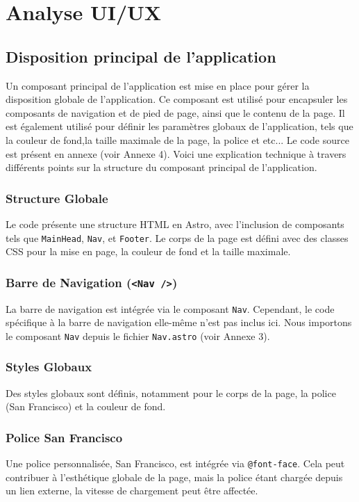 \documentclass[12pt, a4paper, oneside]{article}
\begin{document}
\newpage
\section{Analyse UI/UX}

\subsection{Disposition principal de l'application}

Un composant principal de l'application est mise en place pour gérer la disposition globale de l'application. Ce composant est utilisé pour encapsuler les composants de navigation et de pied de page, ainsi que le contenu de la page. Il est également utilisé pour définir les paramètres globaux de l'application, tels que la couleur de fond,la taille maximale de la page, la police et etc... \newline
Le code source est présent en annexe (voir Annexe 4). Voici une explication technique à travers différents points sur la structure du composant principal de l'application.

\subsubsection{Structure Globale}
Le code présente une structure HTML en Astro, avec l'inclusion de composants tels que \texttt{MainHead}, \texttt{Nav}, et \texttt{Footer}. Le corps de la page est défini avec des classes CSS pour la mise en page, la couleur de fond et la taille maximale.

\subsubsection{Barre de Navigation (\texttt{<Nav />})}
La barre de navigation est intégrée via le composant \texttt{Nav}. Cependant, le code spécifique à la barre de navigation elle-même n'est pas inclus ici. 
Nous importons le composant \texttt{Nav} depuis le fichier \texttt{Nav.astro} (voir Annexe 3).

\subsubsection{Styles Globaux}
Des styles globaux sont définis, notamment pour le corps de la page, la police (San Francisco) et la couleur de fond. 
\subsubsection{Police San Francisco}
Une police personnalisée, San Francisco, est intégrée via \texttt{@font-face}. Cela peut contribuer à l'esthétique globale de la page, mais la police étant chargée depuis un lien externe, la vitesse de chargement peut être affectée.
\end{document}
